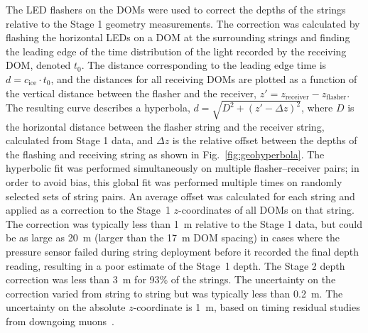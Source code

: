 The LED flashers on the DOMs were used to correct the depths of the strings relative to
the Stage 1 geometry measurements. The correction was calculated by flashing
the horizontal LEDs on a DOM at the surrounding strings and finding the
leading edge of the time distribution of the light recorded by the
receiving DOM, denoted $t_0$. The distance corresponding to the leading
edge time is $d = c_{\mathrm{ice}} \cdot t_0$, and the distances for all receiving
DOMs are plotted as a function of the vertical distance between the flasher
and the receiver, $z' = z_{\mathrm{receiver}} - z_{\mathrm{flasher}}$. The resulting curve
describes a hyperbola, $d = \sqrt{D^2 + (z' -\Delta z)^2}$, where $D$ is
the horizontal distance between the flasher string and the receiver string,
calculated from Stage 1 data, and $\Delta z$ is the relative offset between
the depths of the flashing and receiving string as shown in
Fig.~\ref{fig:geohyperbola}. The hyperbolic fit was performed
simultaneously on multiple flasher--receiver pairs; in order to avoid
bias, this global fit was performed multiple times on randomly
selected sets of string pairs. An average offset was calculated for
each string and applied as a correction to the Stage~1 $z$-coordinates
of all DOMs on that string. The correction was typically less than 1~m
relative to the Stage 1 data, but could be as large as 20~m (larger than the
17~m DOM spacing) in cases where the pressure sensor failed during string
deployment before it recorded the final depth reading, resulting in a
poor estimate of the Stage~1 depth. The Stage 2 depth correction was less than 3~m for 93\%
of the strings. The uncertainty on the correction varied from string
to string but was typically less than 0.2~m. The uncertainty on the
absolute $z$-coordinate is 1~m, based on timing residual studies from
downgoing muons~\cite{IC3:perf}.

